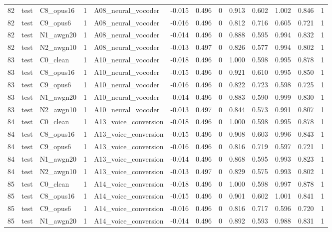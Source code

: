 \begin{tabular}{rllrlrrrrrrrr}
82 & test & C8_opus16 & 1 & A08_neural_vocoder & -0.015 & 0.496 & 0 & 0.913 & 0.602 & 1.002 & 0.846 & 1 \\
82 & test & C9_opus6 & 1 & A08_neural_vocoder & -0.016 & 0.496 & 0 & 0.812 & 0.716 & 0.605 & 0.721 & 1 \\
82 & test & N1_awgn20 & 1 & A08_neural_vocoder & -0.014 & 0.496 & 0 & 0.888 & 0.595 & 0.994 & 0.832 & 1 \\
82 & test & N2_awgn10 & 1 & A08_neural_vocoder & -0.013 & 0.497 & 0 & 0.826 & 0.577 & 0.994 & 0.802 & 1 \\
83 & test & C0_clean & 1 & A10_neural_vocoder & -0.018 & 0.496 & 0 & 1.000 & 0.598 & 0.995 & 0.878 & 1 \\
83 & test & C8_opus16 & 1 & A10_neural_vocoder & -0.015 & 0.496 & 0 & 0.921 & 0.610 & 0.995 & 0.850 & 1 \\
83 & test & C9_opus6 & 1 & A10_neural_vocoder & -0.016 & 0.496 & 0 & 0.822 & 0.723 & 0.598 & 0.725 & 1 \\
83 & test & N1_awgn20 & 1 & A10_neural_vocoder & -0.014 & 0.496 & 0 & 0.883 & 0.590 & 0.999 & 0.830 & 1 \\
83 & test & N2_awgn10 & 1 & A10_neural_vocoder & -0.013 & 0.497 & 0 & 0.844 & 0.573 & 0.991 & 0.807 & 1 \\
84 & test & C0_clean & 1 & A13_voice_conversion & -0.018 & 0.496 & 0 & 1.000 & 0.598 & 0.995 & 0.878 & 1 \\
84 & test & C8_opus16 & 1 & A13_voice_conversion & -0.015 & 0.496 & 0 & 0.908 & 0.603 & 0.996 & 0.843 & 1 \\
84 & test & C9_opus6 & 1 & A13_voice_conversion & -0.016 & 0.496 & 0 & 0.816 & 0.719 & 0.597 & 0.721 & 1 \\
84 & test & N1_awgn20 & 1 & A13_voice_conversion & -0.014 & 0.496 & 0 & 0.868 & 0.595 & 0.993 & 0.823 & 1 \\
84 & test & N2_awgn10 & 1 & A13_voice_conversion & -0.013 & 0.497 & 0 & 0.829 & 0.575 & 0.993 & 0.802 & 1 \\
85 & test & C0_clean & 1 & A14_voice_conversion & -0.018 & 0.496 & 0 & 1.000 & 0.598 & 0.997 & 0.878 & 1 \\
85 & test & C8_opus16 & 1 & A14_voice_conversion & -0.015 & 0.496 & 0 & 0.901 & 0.602 & 1.001 & 0.841 & 1 \\
85 & test & C9_opus6 & 1 & A14_voice_conversion & -0.016 & 0.496 & 0 & 0.816 & 0.717 & 0.596 & 0.720 & 1 \\
85 & test & N1_awgn20 & 1 & A14_voice_conversion & -0.014 & 0.496 & 0 & 0.892 & 0.593 & 0.988 & 0.831 & 1 \\

\end{tabular}

